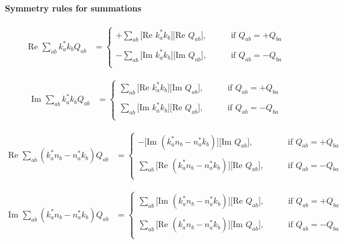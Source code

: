 \paragraph{Symmetry rules for summations}

\begin{align*}
   \text{Re }\sum_{ab} k^*_a k_b Q_{ab} 
&=\begin{cases}
   +\sum_{ab} 
    \Big[\text{Re }k_a^* k_b\Big]\Big[\text{Re }Q_{ab}\Big],
    \qquad &\text{if } Q_{ab} = +Q_{ba} \\
\\
   -\sum_{ab}
    \Big[\text{Im }k_a^* k_b\Big]\Big[\text{Im }Q_{ab}\Big],
    \qquad &\text{if } Q_{ab} = -Q_{ba} \\
  \end{cases}
\end{align*}

\begin{align*}
   \text{Im }\sum_{ab} k^*_a k_b Q_{ab} 
&=\begin{cases}
    \sum_{ab} 
    \Big[\text{Re }k_a^* k_b\Big]\Big[\text{Im }Q_{ab}\Big],
    \qquad &\text{if } Q_{ab} = +Q_{ba} \\
\\
    \sum_{ab} 
    \Big[\text{Im }k_a^* k_b\Big]\Big[\text{Re }Q_{ab}\Big],
    \qquad &\text{if } Q_{ab} = -Q_{ba} \\
  \end{cases}
\end{align*}

\begin{align*}
   \text{Re }\sum_{ab} (k^*_a n_b-n_a^* k_b) Q_{ab}
&=\begin{cases}
   -\Big[\text{Im }(k_a^* n_b - n_a^* k_b)\Big]\Big[\text{Im }Q_{ab}\Big],
    \qquad &\text{if } Q_{ab} = +Q_{ba} \\
\\
    \sum_{ab}
    \Big[\text{Re }(k_a^* n_b - n_a^* k_b)\Big]\Big[\text{Re }Q_{ab}\Big],
    \qquad &\text{if } Q_{ab} = -Q_{ba} \\
  \end{cases}
\end{align*}

\begin{align*}
   \text{Im }\sum_{ab} (k^*_a n_b-n_a^* k_b) Q_{ab}
&=\begin{cases}
    \sum_{ab}
    \Big[\text{Im }(k_a^* n_b - n_a^* k_b)\Big]\Big[\text{Re }Q_{ab}\Big],
    \qquad &\text{if } Q_{ab} = +Q_{ba} \\
\\
    \sum_{ab}
    \Big[\text{Re }(k_a^* n_b - n_a^* k_b)\Big]\Big[\text{Im }Q_{ab}\Big],
    \qquad &\text{if } Q_{ab} = -Q_{ba} \\
  \end{cases}
\end{align*}

